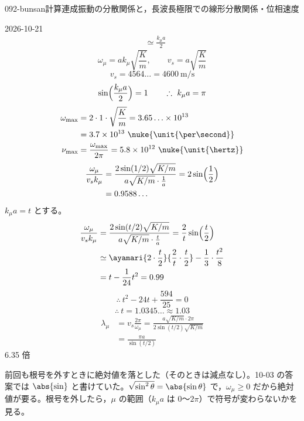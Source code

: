 \documentclass[uplatex,dvipdfmx,a4paper,11pt]{jsarticle}
\begin{document}
\begin{mondai}{092-bunsan}{計算}{連成振動の分散関係と，長波長極限での線形分散関係・位相速度}
\begin{kotaeutsushi}{2026-10-21}
\begin{align*}
  &\simeq\frac{k_\mu a}{2}
\end{align*}
\[ \omega_\mu=ak_\mu\sqrt{\frac{K}{m}},\qquad v_s=a\sqrt{\frac{K}{m}} \]
\[ v_s=4564\ldots=\qty{4600}{\metre\per\second} \]
\[ \sin\Bigl(\frac{k_\mu a}{2}\Bigr)=1\qquad\therefore\ k_\mu a=\pi \]
\begin{align*}
  \omega_{\max}&=2\cdot1\cdot\sqrt{\frac{K}{m}}=3.65\ldots\times10^{13}\\
  &=3.7\times10^{13}\ \nuke{\unit{\per\second}}\\
  \nu_{\max}&=\frac{\omega_{\max}}{2\pi}=5.8\times10^{12}\ \nuke{\unit{\hertz}}
\end{align*}
\begin{align*}
  \frac{\omega_\mu}{v_sk_\mu}&=\frac{2\sin(1/2)\sqrt{K/m}}{a\sqrt{K/m}\cdot\frac{1}{a}}=2\sin\Bigl(\frac{1}{2}\Bigr)\\
  &=0.9588\ldots
\end{align*}
$k_\mu a=t$ とする。
\begin{align*}
  \frac{\omega_\mu}{v_sk_\mu}&=\frac{2\sin(t/2)\sqrt{K/m}}{a\sqrt{K/m}\cdot\frac{t}{a}}=\frac{2}{t}\sin\Bigl(\frac{t}{2}\Bigr)\\
  &\simeq\ayamari{2\cdot\frac{t}{2}}{\frac{2}{t}\cdot\frac{t}{2}}-\frac{1}{3}\cdot\frac{t^{2}}{8}\\
  &=t-\frac{1}{24}t^{2}=0.99
\end{align*}
\[ \therefore\ t^{2}-24t+\frac{594}{25}=0 \]
\[ \therefore\ t=1.0345\ldots\approx1.03 \]
\begin{align*}
  \lambda_\mu&=v_s\frac{2\pi}{\omega_\mu}=\frac{a\sqrt{K/m}\cdot2\pi}{2\sin(t/2)\sqrt{K/m}}\\
  &=\frac{\pi a}{\sin(t/2)}
\end{align*}
6.35 倍
\end{kotaeutsushi}
\begin{kizuki}
\item {} 前回も根号を外すときに絶対値を落とした（そのときは減点なし）。10-03 の答案では $\abs{\sin}$ と書けていた。$\sqrt{\sin^{2}\theta}=\abs{\sin\theta}$ で，$\omega_\mu\ge0$ だから絶対値が要る。根号を外したら，$\mu$ の範囲（$k_\mu a$ は $0$〜$2\pi$）で符号が変わらないかを見る。

\end{kizuki}
\end{mondai}
\end{document}
